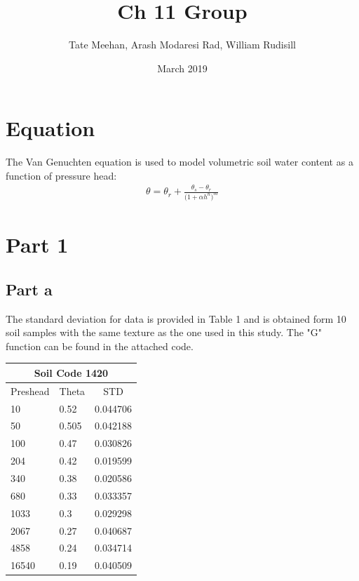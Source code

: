 \documentclass{article}
\title{Ch 11 Group}
\author{Tate Meehan, Arash Modaresi Rad, William Rudisill}
\date{March 2019}
\begin{document}
\maketitle

\section*{Equation}
The Van Genuchten equation is used to model volumetric soil water content as a function of pressure head: 
\begin{align}
\theta = \theta_r + \frac{\theta_s - \theta_r}{\big(1 + \alpha h^n\big)^m}
\end{align}


\section*{Part 1}
\subsection*{Part a}
The standard deviation for data is provided in Table 1 and is obtained form 10 soil samples with the same texture as the one used in this study. The "G" function can be found in the attached code. 


\begin{table}[]
\begin{tabular}{lll}
\hline
\multicolumn{3}{c}{Soil Code 1420}              \\ \hline
Preshead & Theta & \multicolumn{1}{c}{STD}      \\ \hline
10       & 0.52  & \multicolumn{1}{r}{0.044706} \\
50       & 0.505 & \multicolumn{1}{r}{0.042188} \\
100      & 0.47  & \multicolumn{1}{r}{0.030826} \\
204      & 0.42  & \multicolumn{1}{r}{0.019599} \\
340      & 0.38  & \multicolumn{1}{r}{0.020586} \\
680      & 0.33  & 0.033357                     \\
1033     & 0.3   & 0.029298                     \\
2067     & 0.27  & 0.040687                     \\
4858     & 0.24  & 0.034714                     \\
16540    & 0.19  & 0.040509                     \\ \hline
\end{tabular}
\end{table}
\end{document}
